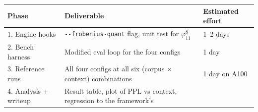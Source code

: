 \documentclass[
  11pt,
]{article}
\begin{document}
\begin{longtable}[]{@{}lll@{}}
\toprule
\begin{minipage}[b]{0.30\columnwidth}\raggedright
Phase\strut
\end{minipage} & \begin{minipage}[b]{0.30\columnwidth}\raggedright
Deliverable\strut
\end{minipage} & \begin{minipage}[b]{0.30\columnwidth}\raggedright
Estimated effort\strut
\end{minipage}\tabularnewline
\midrule
\endhead
\begin{minipage}[t]{0.30\columnwidth}\raggedright
1. Engine hooks\strut
\end{minipage} & \begin{minipage}[t]{0.30\columnwidth}\raggedright
\texttt{-\/-frobenius-quant} flag, unit test for
\(\varphi_{11}^8\)\strut
\end{minipage} & \begin{minipage}[t]{0.30\columnwidth}\raggedright
1--2 days\strut
\end{minipage}\tabularnewline
\begin{minipage}[t]{0.30\columnwidth}\raggedright
2. Bench harness\strut
\end{minipage} & \begin{minipage}[t]{0.30\columnwidth}\raggedright
Modified eval loop for the four configs\strut
\end{minipage} & \begin{minipage}[t]{0.30\columnwidth}\raggedright
1 day\strut
\end{minipage}\tabularnewline
\begin{minipage}[t]{0.30\columnwidth}\raggedright
3. Reference runs\strut
\end{minipage} & \begin{minipage}[t]{0.30\columnwidth}\raggedright
All four configs at all six (corpus × context) combinations\strut
\end{minipage} & \begin{minipage}[t]{0.30\columnwidth}\raggedright
1 day on A100\strut
\end{minipage}\tabularnewline
\begin{minipage}[t]{0.30\columnwidth}\raggedright
4. Analysis + writeup\strut
\end{minipage} & \begin{minipage}[t]{0.30\columnwidth}\raggedright
Result table, plot of PPL vs context, regression to the framework's

\end{minipage}
\end{longtable}
\end{document}

